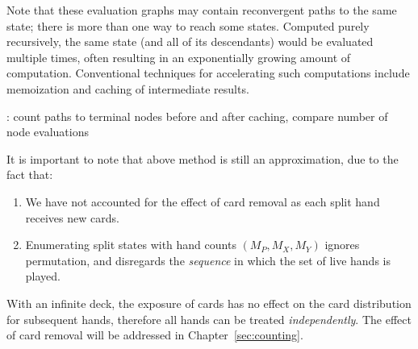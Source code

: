 Note that these evaluation graphs may contain reconvergent paths
to the same state; there is more than one way to reach some states.
Computed purely recursively, the same state (and all of its descendants)
would be evaluated multiple times, 
often resulting in an exponentially growing amount of computation.  
Conventional techniques for accelerating such computations
include memoization and caching of intermediate results.  

\TODO: count paths to terminal nodes before and after caching,
compare number of node evaluations

\begin{comment}
For $S=1,P=1$:
\begin{eqnarray}
P &\goesto& p^2 \Brack{XX} +2pq \Brack{XY} +q^2 \Brack{YY}
\end{eqnarray}

For $S=2,P=1$:
\begin{eqnarray}
P &\goesto& p^2\Brack{PX} +2pq\Brack{PY} +q^2\Brack{YY} \\
&\goesto& p^2\Brack{X\Paren{p^2\Brack{XX} +2pq\Brack{XY} +q^2\Brack{YY}}}
 +2pq\Brack{Y\Paren{p^2\Brack{XX} +2pq\Brack{XY} +q^2\Brack{YY}}}
 +q^2\Brack{YY} \\
&\equiv& \ldots
\end{eqnarray}

For $S=3,P=1$:
\begin{eqnarray}
P &\goesto& PP +2PY +YY \\
&\goesto& \ldots
\end{eqnarray}
\end{comment}

It is important to note that above method is still an approximation,
due to the fact that:

\begin{enumerate}
\item We have not accounted for the effect of card removal as 
each split hand receives new cards.
\item Enumerating split states with hand counts $(M_P, M_X, M_Y)$ 
ignores permutation, 
and disregards the \emph{sequence} in which the set of live hands is played. 
\end{enumerate}

\noindent
With an infinite deck, the exposure of cards has no effect on the
card distribution for subsequent hands, therefore all hands can be 
treated \emph{independently}.  
The effect of card removal will be addressed in Chapter~\ref{sec:counting}.


